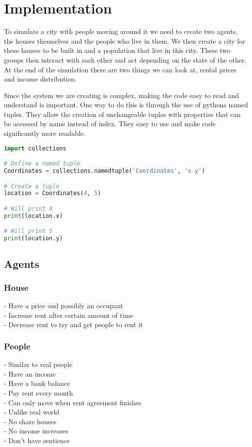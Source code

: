 \section{Implementation}

\par
To simulate a city with people moving around it we need to create two agents, the houses themselves and the people who live in them. We then create a city for these houses to be built in and a population that live in this city. These two groups then interact with each other and act depending on the state of the other. At the end of the simulation there are two things we can look at, rental prices and income distribution.

Since the system we are creating is complex, making the code easy to read and understand is important. One way to do this is through the use of pythons named tuples. They allow the creation of unchangeable tuples with properties that can be accessed by name instead of index. They easy to use and make code significantly more readable.

\begin{lstlisting}[language=Python]
import collections

# Define a named tuple
Coordinates = collections.namedtuple('Coordinates', 'x y')

# Create a tuple
location = Coordinates(4, 5)

# Will print 4
print(location.x)

# Will print 5
print(location.y)
\end{lstlisting}

\subsection{Agents}

\subsubsection{House}
\par
- Have a price and possibly an occupant \\
- Increase rent after certain amount of time \\
- Decrease rent to try and get people to rent it \\

\subsubsection{People}
\par
- Similar to real people \\
  - Have an income \\
  - Have a bank balance \\
  - Pay rent every month \\
  - Can only move when rent agreement finishes \\
- Unlike real world \\
  - No share houses \\
  - No income increases \\
  - Don't have sentience \\

